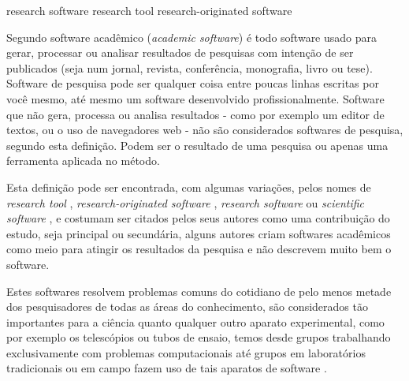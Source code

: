 %

research software 
research tool \cite{Portillo12}
research-originated software \cite{Kon2011}


Segundo  software acadêmico ({\it academic
software}) é todo software usado para gerar, processar ou analisar resultados
de pesquisas com intenção de ser publicados (seja num jornal, revista,
conferência, monografia, livro ou tese). Software de pesquisa pode ser qualquer
coisa entre poucas linhas escritas por você mesmo, até mesmo um software
desenvolvido profissionalmente. Software que não gera, processa ou analisa
resultados - como por exemplo um editor de textos, ou o uso de navegadores web
- não são considerados softwares de pesquisa, segundo esta definição.
Podem ser o resultado de uma pesquisa ou apenas uma ferramenta aplicada
no método.

Esta definição pode ser encontrada, com algumas variações, pelos nomes de
{\it research tool} \cite{Portillo12},
{\it research-originated software} \cite{Kon2011},
{\it research software} \cite{hettrick_2014_14809} ou
{\it scientific software} \cite{segal2008developing},
e costumam ser citados
pelos seus autores como uma contribuição do estudo, seja principal ou
secundária, alguns autores criam softwares acadêmicos como meio para atingir os
resultados da pesquisa e não descrevem muito bem o software.

Estes softwares resolvem problemas comuns do cotidiano de pelo menos metade dos
pesquisadores de todas as áreas do conhecimento, são considerados tão
importantes para a ciência quanto qualquer outro aparato experimental, como por
exemplo os telescópios ou tubos de ensaio, temos desde grupos trabalhando
exclusivamente com problemas computacionais até grupos em laboratórios
tradicionais ou em campo fazem uso de tais aparatos de software
\cite{wilson2014best}.


